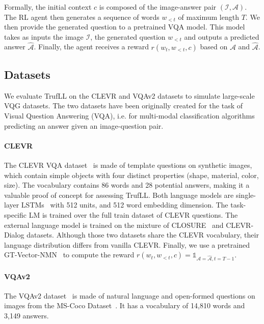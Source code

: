 \documentclass{article}
\newcommand{\image}{\mathcal{I}}
\newcommand{\answer}{\mathcal{A}}
\newcommand{\algo}{TrufLL\xspace}
\newcommand{\indicatrice}[1]{\mathds{1}_{#1}}
\begin{document}
Formally, the initial context $c$ is composed of the image-answer pair $(\image, \answer)$. The RL agent then generates a sequence of words $w_{<t}$ of maximum length $T$. We then provide the generated question to a pretrained VQA model. This model takes as inputs the image $\image$, the generated question $w_{<t}$ and outputs a predicted answer $\hat{\answer}$. Finally, the agent receives a reward $r(w_t, w_{<t}, c)$ based on $\answer$ and $\hat{\answer}$.


\subsection{Datasets} 
We evaluate \algo on the CLEVR and VQAv2 datasets to simulate large-scale VQG datasets. The two datasets have been originally created for the task of Visual Question Answering (VQA), i.e. for multi-modal classification algorithms predicting an answer given an image-question pair. 


\paragraph{CLEVR}

The CLEVR VQA dataset~\citep{johnson2017clevr} is made of template questions on synthetic images, which contain simple objects with four distinct properties (shape, material, color, size). The vocabulary contains 86 words and 28 potential answers, making it a valuable proof of concept for assessing \algo. Both language models are single-layer LSTMs~\cite{hochreiter1997long} with 512 units, and 512 word embedding dimension. The task-specific LM is trained over the full train dataset of CLEVR questions. The external language model is trained on the mixture of CLOSURE~\cite{bahdanau2019closure} and CLEVR-Dialog \cite{kottur2019clevr} datasets. Although those two datasets share the CLEVR vocabulary, their language distribution differs from vanilla CLEVR. 
Finally, we use a pretrained GT-Vector-NMN~\citep{bahdanau2019closure} to compute the reward $r(w_t, w_{<t}, c) = \indicatrice{\answer=\hat{\answer}, t=T-1}$.


\paragraph{VQAv2}

The VQAv2 dataset~\citep{goyal2017making} is made of natural language and open-formed questions on images from the MS-Coco Dataset~\citep{lin2014microsoft}. It has a vocabulary of 14,810 words and 3,149 answers.
\end{document}

